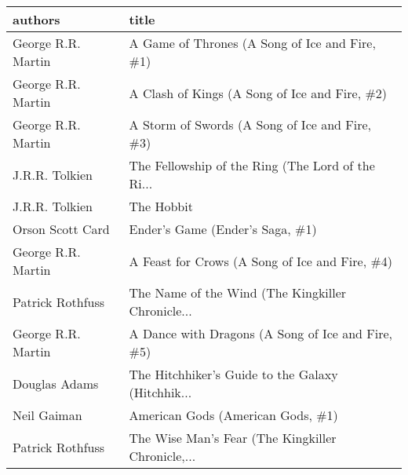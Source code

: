 \begin{tabular}{ll}
\toprule
            authors &                                              title \\
\midrule
 George R.R. Martin &     A Game of Thrones (A Song of Ice and Fire, \#1) \\
 George R.R. Martin &     A Clash of Kings  (A Song of Ice and Fire, \#2) \\
 George R.R. Martin &     A Storm of Swords (A Song of Ice and Fire, \#3) \\
     J.R.R. Tolkien &  The Fellowship of the Ring (The Lord of the Ri... \\
     J.R.R. Tolkien &                                         The Hobbit \\
   Orson Scott Card &                    Ender's Game (Ender's Saga, \#1) \\
 George R.R. Martin &     A Feast for Crows (A Song of Ice and Fire, \#4) \\
   Patrick Rothfuss &  The Name of the Wind (The Kingkiller Chronicle... \\
 George R.R. Martin &  A Dance with Dragons (A Song of Ice and Fire, \#5) \\
      Douglas Adams &  The Hitchhiker's Guide to the Galaxy (Hitchhik... \\
        Neil Gaiman &                  American Gods (American Gods, \#1) \\
   Patrick Rothfuss &  The Wise Man's Fear (The Kingkiller Chronicle,... \\
\bottomrule
\end{tabular}
